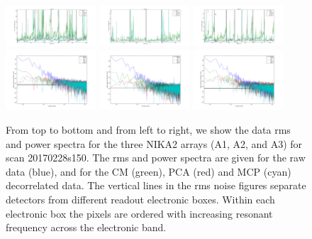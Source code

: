 \begin{figure}[ht!] %
\begin{center}
\includegraphics[width=0.3\textwidth]{Figures/NoiseTests/rms_TOI_array_1_20170228s151.pdf}
\includegraphics[width=0.3\textwidth]{Figures/NoiseTests/rms_TOI_array_2_20170228s151.pdf}
\includegraphics[width=0.3\textwidth]{Figures/NoiseTests/rms_TOI_array_3_20170228s151.pdf}
\includegraphics[width=0.3\textwidth]{Figures/NoiseTests/pws_TOI_array_1_20170228s151.pdf}
\includegraphics[width=0.3\textwidth]{Figures/NoiseTests/pws_TOI_array_2_20170228s151.pdf}
\includegraphics[width=0.3\textwidth]{Figures/NoiseTests/pws_TOI_array_3_20170228s151.pdf}
\end{center}
\caption[Noise RMS and power spectra]{From top to bottom and from left to right,
  we show the data rms and power spectra for the three NIKA2 arrays (A1, A2, and
  A3) for scan 20170228s150. The rms and power spectra are given for the raw
  data (blue), and for the CM (green), PCA (red) and MCP (cyan) decorrelated
  data. The vertical lines in the rms noise figures separate detectors from
  different readout electronic boxes. Within each electronic box the pixels are
  ordered with increasing resonant frequency across the electronic
  band. \label{rmspws}}
\end{figure}

